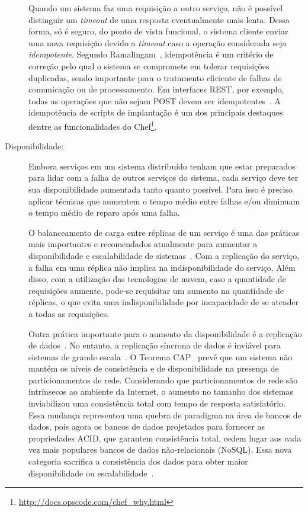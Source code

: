 \begin{description}
Quando um sistema faz uma requisição a outro serviço, não é possível distinguir um \emph{timeout} de uma resposta eventualmente mais lenta. Dessa forma, só é seguro, do ponto de vista funcional, o sistema cliente enviar uma nova requisição devido a \emph{timeout} caso a operação considerada seja \emph{idempotente}. 
Segundo Ramalingam~\cite{Ramalingam2013Idempotence}, idempotência é um critério de correção pelo qual o sistema se compromete em tolerar requisições duplicadas, sendo importante para o tratamento eficiente de falhas de comunicação ou de processamento.
Em interfaces REST, por exemplo, todas as operações que não sejam POST devem ser idempotentes~\cite{Allamaraju2010REST}. A idempotência de scripts
de implantação é um dos principais destaques dentre as funcionalidades do 
Chef\footnote{\url{http://docs.opscode.com/chef_why.html}}.

\item [Disponibilidade:]

Embora serviços em um sistema distribuído tenham que estar preparados para lidar
com a falha de outros serviços do sistema,
cada serviço deve ter sua disponibilidade aumentada tanto quanto possível. 
Para isso é preciso aplicar técnicas que
aumentem o tempo médio entre falhas e/ou diminuam o tempo médio de reparo após uma falha.

O balanceamento de carga entre réplicas de um serviço é uma das práticas mais importantes e 
recomendados atualmente para aumentar a disponibilidade e escalabilidade de sistemas~\cite{Amazon2012Practices}.
Com a replicação do serviço, a falha em uma réplica não implica na indisponibilidade
do serviço. Além disso, com a utilização das tecnologias de nuvem,
caso a quantidade de requisições aumente, pode-se requisitar um aumento na quantidade de réplicas,
o que evita uma indisponibilidade por incapacidade de se atender a todas as requisições.

Outra prática importante para o aumento da disponibilidade é a replicação de dados~\cite{Brewer2001GiantScale}.
No entanto, a replicação síncrona de dados é inviável para sistemas de grande escala~\cite{Helland2009Quicksand}.
O Teorema CAP~\cite{Brewer2012Cap} prevê que um sistema não mantém os níveis de consistência e de disponibilidade na presença de particionamentos de rede. Considerando que particionamentos de rede são intrínsecos ao ambiente da Internet, o aumento no tamanho dos sistemas inviabilizou uma consistência total com tempo de resposta satisfatório. 
Essa mudança representou uma quebra de paradigma na área de bancos de dados,
pois agora os bancos de dados projetados para fornecer as propriedades ACID,
que garantem consistência total, cedem lugar aos cada vez mais populares
bancos de dados não-relacionais (NoSQL).
Essa nova categoria sacrifica a consistência dos dados para obter maior disponibilidade ou escalabilidade~\cite{Cattell2011NoSql}.


\end{description}
